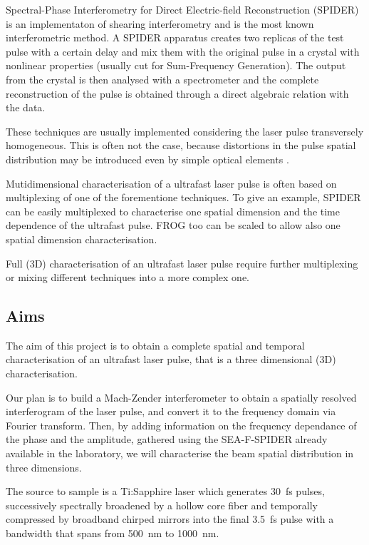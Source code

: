 \documentclass[12pt,a4paper,twoside]{article}
\begin{document}
Spectral-Phase Interferometry for Direct Electric-field Reconstruction (SPIDER) is an implementaton of shearing interferometry and is the most known interferometric method.
A SPIDER apparatus creates two replicas of the test pulse with a certain delay and mix them with the original pulse in a crystal with nonlinear properties (usually cut for Sum-Frequency Generation).
The output from the crystal is then analysed with a spectrometer and the complete reconstruction of the pulse is obtained through a direct algebraic relation with the data.

These techniques are usually implemented considering the laser pulse transversely homogeneous.
This is often not the case, because distortions in the pulse spatial distribution may be introduced even by simple optical elements \cite{bor}.

Mutidimensional characterisation of a ultrafast laser pulse is often based on multiplexing of one of the forementione techniques.
To give an example, SPIDER can be easily multiplexed to characterise one spatial dimension and the time dependence of the ultrafast pulse.
FROG too can be scaled to allow also one spatial dimension characterisation.

Full (3D) characterisation of an ultrafast laser pulse require further multiplexing or mixing different techniques into a more complex one.

\subsection{Aims}

The aim of this project is to obtain a complete spatial and temporal characterisation of an ultrafast laser pulse, that is a three dimensional (3D) characterisation.

Our plan is to build a Mach-Zender interferometer to obtain a spatially resolved interferogram of the laser pulse, and convert it to the frequency domain via Fourier transform.
Then, by adding information on the frequency dependance of the phase and the amplitude, gathered using the SEA-F-SPIDER already available in the laboratory, we will characterise the beam spatial distribution in three dimensions.

The source to sample is a Ti:Sapphire laser which generates \SI{30}{\fs} pulses, successively spectrally broadened by a hollow core fiber and temporally compressed by broadband chirped mirrors into the final \SI{3.5}{\fs} pulse with a bandwidth that spans from \SI{500}{\nm} to \SI{1000}{\nm}.
\end{document}
